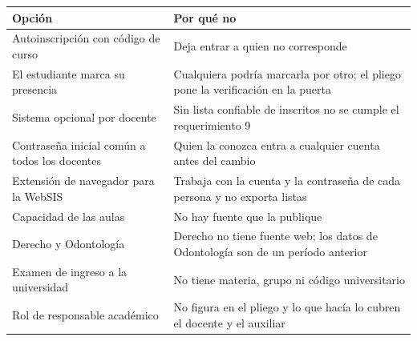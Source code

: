 \documentclass[11pt,letterpaper]{article}
\begin{document}
\begin{center}
\begin{tabular}{@{}L{5.4cm}L{10.4cm}@{}}
\hline
\textbf{Opción} & \textbf{Por qué no} \\
\hline
Autoinscripción con código de curso & Deja entrar a quien no corresponde \\
El estudiante marca su presencia & Cualquiera podría marcarla por otro; el pliego pone la verificación en la puerta \\
Sistema opcional por docente & Sin lista confiable de inscritos no se cumple el requerimiento 9 \\
Contraseña inicial común a todos los docentes & Quien la conozca entra a cualquier cuenta antes del cambio \\
Extensión de navegador para la WebSIS & Trabaja con la cuenta y la contraseña de cada persona y no exporta listas \\
Capacidad de las aulas & No hay fuente que la publique \\
Derecho y Odontología & Derecho no tiene fuente web; los datos de Odontología son de un período anterior \\
Examen de ingreso a la universidad & No tiene materia, grupo ni código universitario \\
Rol de responsable académico & No figura en el pliego y lo que hacía lo cubren el docente y el auxiliar \\
\hline
\end{tabular}
\end{center}
\end{document}
